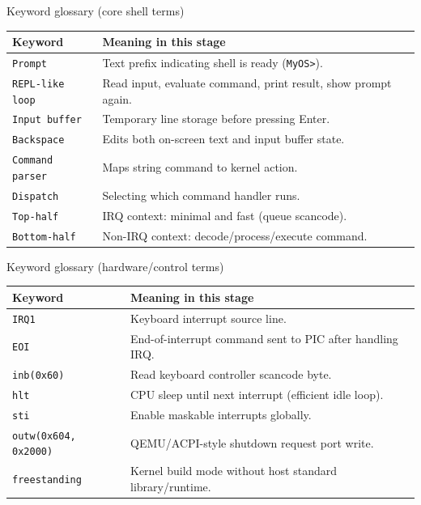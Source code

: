 \documentclass[aspectratio=169]{beamer}
\begin{document}
\begin{frame}{Keyword glossary (core shell terms)}
  \small
  \begin{tabular}{@{}p{2.8cm}p{9.2cm}@{}}
    \toprule
    \textbf{Keyword} & \textbf{Meaning in this stage} \\
    \midrule
    \texttt{Prompt} & Text prefix indicating shell is ready (\texttt{MyOS>}). \\
    \texttt{REPL-like loop} & Read input, evaluate command, print result, show prompt again. \\
    \texttt{Input buffer} & Temporary line storage before pressing Enter. \\
    \texttt{Backspace} & Edits both on-screen text and input buffer state. \\
    \texttt{Command parser} & Maps string command to kernel action. \\
    \texttt{Dispatch} & Selecting which command handler runs. \\
    \texttt{Top-half} & IRQ context: minimal and fast (queue scancode). \\
    \texttt{Bottom-half} & Non-IRQ context: decode/process/execute command. \\
    \bottomrule
  \end{tabular}
\end{frame}

\begin{frame}{Keyword glossary (hardware/control terms)}
  \small
  \begin{tabular}{@{}p{2.8cm}p{9.2cm}@{}}
    \toprule
    \textbf{Keyword} & \textbf{Meaning in this stage} \\
    \midrule
    \texttt{IRQ1} & Keyboard interrupt source line. \\
    \texttt{EOI} & End-of-interrupt command sent to PIC after handling IRQ. \\
    \texttt{inb(0x60)} & Read keyboard controller scancode byte. \\
    \texttt{hlt} & CPU sleep until next interrupt (efficient idle loop). \\
    \texttt{sti} & Enable maskable interrupts globally. \\
    \texttt{outw(0x604, 0x2000)} & QEMU/ACPI-style shutdown request port write. \\
    \texttt{freestanding} & Kernel build mode without host standard library/runtime. \\
    \bottomrule
  \end{tabular}
\end{frame}
\end{document}
